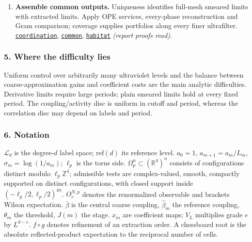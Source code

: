 \documentclass[
  letterpaper,
  11pt]{article}
\begin{document}
\begin{enumerate}
  limits.
  \href{https://github.com/yang-mills-group/OpenAI-YM-20261028/blob/3456e5e75cf8d4cd558955a5c7638fba2d68f464/YM/UVExtension/Poppy/Fountain.lean\#L96-L108}{\texttt{Poppy.blossoms}},
  \href{https://github.com/yang-mills-group/OpenAI-YM-20261028/blob/3456e5e75cf8d4cd558955a5c7638fba2d68f464/YM/UVExtension/Beach/Under.lean\#L43-L63}{\texttt{Beach.sparksP}}
  \emph{(proofs read through stated transfer estimates)}.
\item
  \textbf{Assemble common outputs.} Uniqueness identifies full-mesh
  smeared limits with extracted limits. Apply OPE services, every-phase
  reconstruction and Gram comparison; coverage supplies portfolios along
  every finer ultrafilter.
  \href{https://github.com/yang-mills-group/OpenAI-YM-20261028/blob/3456e5e75cf8d4cd558955a5c7638fba2d68f464/YM/SharpGram/Common.lean\#L16-L37}{\texttt{coordination}},
  \href{https://github.com/yang-mills-group/OpenAI-YM-20261028/blob/3456e5e75cf8d4cd558955a5c7638fba2d68f464/YM/SharpGram/Common.lean\#L41-L60}{\texttt{common}},
  \href{https://github.com/yang-mills-group/OpenAI-YM-20261028/blob/3456e5e75cf8d4cd558955a5c7638fba2d68f464/YM/SharpGram/Measured.lean\#L11-L36}{\texttt{habitat}}
  \emph{(report proofs read)}.
\end{enumerate}

\subsubsection{5. Where the difficulty
lies}\label{where-the-difficulty-lies-15}

Uniform control over arbitrarily many ultraviolet levels and the balance
between coarse-approximation gains and coefficient costs are the main
analytic difficulties. Derivative limits require large periods; plain
smeared limits hold at every fixed period. The coupling/activity disc is
uniform in cutoff and period, whereas the correlation disc may depend on
labels and period.

\subsubsection{6. Notation}\label{notation-15}

\(\mathcal L_d\) is the degree-\(d\) label space; \(\mathrm{ref}(d)\)
its reference level. \(a_0=1\), \(a_{m+1}=a_m/L_m\),
\(\sigma_m=\log(1/a_m)\); \(\ell_p\) is the torus side.
\(\Omega_p^n\subset(\mathbb R^4)^n\) consists of configurations distinct
modulo \(\ell_p\mathbb Z^4\); admissible tests are complex-valued,
smooth, compactly supported on distinct configurations, with closed
support inside \((-\ell_p/2,\ell_p/2)^{4n}\). \(O_v^{N,p}\) denotes the
renormalized observable and brackets Wilson expectation. \(\bar\beta\)
is the central coarse coupling, \(\hat\beta_m\) the reference coupling,
\(\theta_m\) the threshold, \(J(m)\) the stage. \(x_m\) are coefficient
maps; \(V_L\) multiplies grade \(e\) by \(L^{d-e}\). \(f\circ g\)
denotes refinement of an extraction order. A chessboard root is the
absolute reflected-product expectation to the reciprocal number of
cells.
\end{document}

